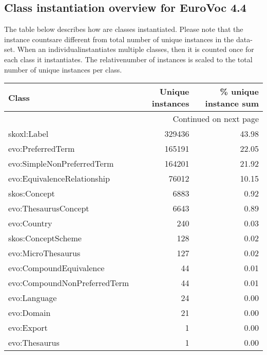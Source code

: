 \documentclass[10pt,a4paper,titlepage,final]{article}
\begin{document}
\subsection{Class instantiation overview for EuroVoc 4.4}
The table below describes how are classes instantiated. Please note that the instance countsare different from total number of unique instances in the data{-}set. When an individualinstantiates multiple classes, then it is counted once for each class it instantiates. The relativenumber of instances is scaled to the total number of unique instances per class.
\begin{longtable}{lrr}
\toprule
                        Class &  Unique instances &  \% unique instance sum \\
\midrule
\endhead
\midrule
\multicolumn{3}{r}{{Continued on next page}} \\
\midrule
\endfoot

\bottomrule
\endlastfoot
                  skoxl:Label &            329436 &                  43.98 \\
            evo:PreferredTerm &            165191 &                  22.05 \\
   evo:SimpleNonPreferredTerm &            164201 &                  21.92 \\
  evo:EquivalenceRelationship &             76012 &                  10.15 \\
                 skos:Concept &              6883 &                   0.92 \\
         evo:ThesaurusConcept &              6643 &                   0.89 \\
                  evo:Country &               240 &                   0.03 \\
           skos:ConceptScheme &               128 &                   0.02 \\
           evo:MicroThesaurus &               127 &                   0.02 \\
      evo:CompoundEquivalence &                44 &                   0.01 \\
 evo:CompoundNonPreferredTerm &                44 &                   0.01 \\
                 evo:Language &                24 &                   0.00 \\
                   evo:Domain &                21 &                   0.00 \\
                   evo:Export &                 1 &                   0.00 \\
                evo:Thesaurus &                 1 &                   0.00 \\
\end{longtable}
\end{document}
